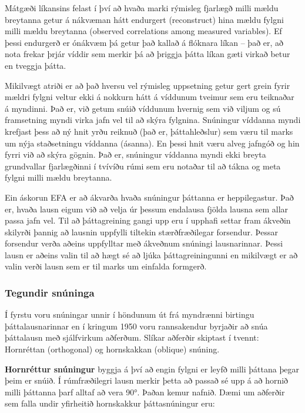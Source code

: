 \documentclass[]{book}
\begin{document}
Mátgæði líkansins felast í því að hvaða marki rýmisleg fjarlægð milli mældu breytanna getur á nákvæman hátt endurgert (reconstruct) hina mældu fylgni milli mældu breytanna (observed correlations among measured variables). Ef þessi endurgerð er ónákvæm þá getur það kallað á flóknara líkan -- það er, að nota frekar þrjár víddir sem merkir þá að þriggja þátta líkan gæti virkað betur en tveggja þátta.

Mikilvægt atriði er að það hversu vel rýmisleg uppsetning getur gert grein fyrir mældri fylgni veltur ekki á nokkurn hátt á víddunum tveimur sem eru teiknaðar á myndinni. Það er, við getum snúið víddunum hvernig sem við viljum og sú framsetning myndi virka jafn vel til að skýra fylgnina. Snúningur víddanna myndi krefjast þess að ný hnit yrðu reiknuð (það er, þáttahleðslur) sem væru til marks um nýja staðsetningu víddanna (ásanna). En þessi hnit væru alveg jafngóð og hin fyrri við að skýra gögnin. Það er, snúningur víddanna myndi ekki breyta grundvallar fjarlægðinni í tvívíðu rúmi sem eru notaðar til að tákna og meta fylgni milli mældu breytanna.

Ein áskorun EFA er að ákvarða hvaða snúningur þáttanna er heppilegastur. Það er, hvaða lausn eigum við að velja úr þessum endalausa fjölda lausna sem allar passa jafn vel. Til að þáttagreining gangi upp eru í upphafi settar fram ákveðin skilyrði þannig að lausnin uppfylli tiltekin stærðfræðilegar forsendur. Þessar forsendur verða aðeins uppfylltar með ákveðnum snúningi lausnarinnar. Þessi lausn er aðeins valin til að hægt sé að ljúka þáttagreiningunni en mikilvægt er að valin verði lausn sem er til marks um einfalda formgerð.

\hypertarget{tegundir-snuxfaninga}{%
\subsubsection{Tegundir snúninga}\label{tegundir-snuxfaninga}}

Í fyrstu voru snúningar unnir í höndunum út frá myndrænni birtingu þáttalausnarinnar en í kringum 1950 voru rannsakendur byrjaðir að snúa þáttalausn með sjálfvirkum aðferðum. Slíkar aðferðir skiptast í tvennt: Hornréttan (orthogonal) og hornskakkan (oblique) snúning.

\textbf{Hornréttur snúningur} byggja á því að engin fylgni er leyfð milli þáttana þegar þeim er snúið. Í rúmfræðilegri lausn merkir þetta að passað sé upp á að hornið milli þáttanna þarf alltaf að vera 90°. Þaðan kemur nafnið. Dæmi um aðferðir sem falla undir yfirheitið hornskakkur þáttasnúningur eru:
\end{document}
